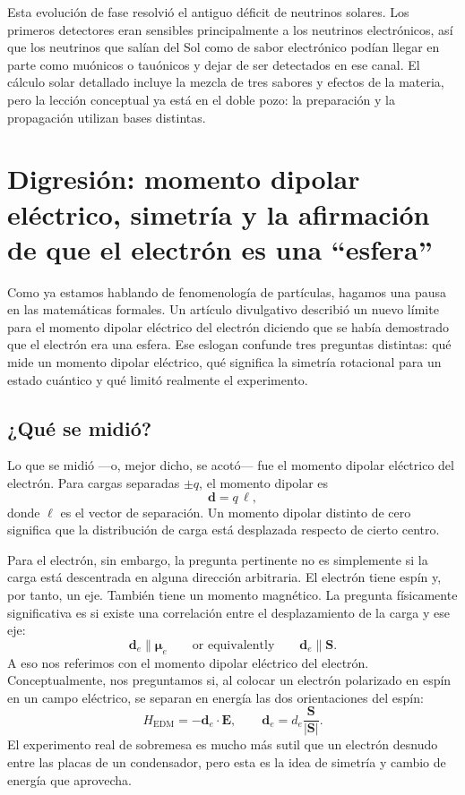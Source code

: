 Esta evolución de fase resolvió el antiguo déficit de neutrinos solares. Los primeros detectores eran sensibles principalmente a los neutrinos electrónicos, así que los neutrinos que salían del Sol como de sabor electrónico podían llegar en parte como muónicos o tauónicos y dejar de ser detectados en ese canal. El cálculo solar detallado incluye la mezcla de tres sabores y efectos de la materia, pero la lección conceptual ya está en el doble pozo: la preparación y la propagación utilizan bases distintas.

\section{Digresión: momento dipolar eléctrico, simetría y la afirmación de que el electrón es una ``esfera''}

Como ya estamos hablando de fenomenología de partículas, hagamos una pausa en las matemáticas formales. Un artículo divulgativo describió un nuevo límite para el momento dipolar eléctrico del electrón diciendo que se había demostrado que el electrón era una esfera. Ese eslogan confunde tres preguntas distintas: qué mide un momento dipolar eléctrico, qué significa la simetría rotacional para un estado cuántico y qué limitó realmente el experimento.

\subsection{¿Qué se midió?}

Lo que se midió —o, mejor dicho, se acotó— fue el momento dipolar eléctrico del electrón. Para cargas separadas \(\pm q\), el momento dipolar es
\begin{equation}
\mathbf d = q\,\boldsymbol{\ell},
\end{equation}
donde \(\boldsymbol{\ell}\) es el vector de separación. Un momento dipolar distinto de cero significa que la distribución de carga está desplazada respecto de cierto centro.

Para el electrón, sin embargo, la pregunta pertinente no es simplemente si la carga está descentrada en alguna dirección arbitraria. El electrón tiene espín y, por tanto, un eje. También tiene un momento magnético. La pregunta físicamente significativa es si existe una correlación entre el desplazamiento de la carga y ese eje:
\begin{equation}
\mathbf d_e \parallel \boldsymbol{\mu}_e
\qquad \text{or equivalently} \qquad
\mathbf d_e \parallel \mathbf S .
\end{equation}
A eso nos referimos con el momento dipolar eléctrico del electrón. Conceptualmente, nos preguntamos si, al colocar un electrón polarizado en espín en un campo eléctrico, se separan en energía las dos orientaciones del espín:
\begin{equation}
H_{\mathrm{EDM}}=-\mathbf d_e\cdot \mathbf E,
\qquad
\mathbf d_e=d_e\frac{\mathbf S}{|\mathbf S|}.
\end{equation}
El experimento real de sobremesa es mucho más sutil que un electrón desnudo entre las placas de un condensador, pero esta es la idea de simetría y cambio de energía que aprovecha.

